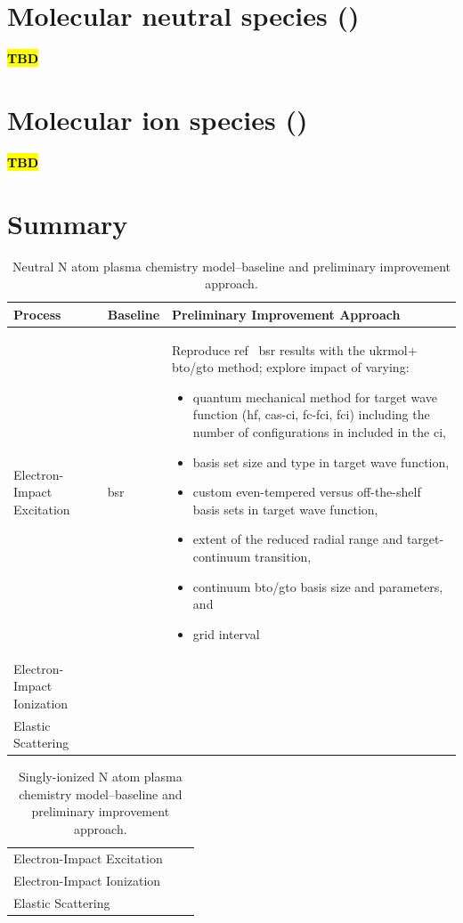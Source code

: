 \documentclass[12pt]{article}
\newcommand{\tbd}{\textcolor{red}{\textbf{\hl{TBD}}}}
\begin{document}
\section{Molecular neutral species ()}
\tbd

\section{Molecular ion species ()}
\tbd

\section{Summary}

\begin{table}
		\caption{Neutral N atom plasma chemistry model--baseline and preliminary improvement approach.}
		\centering
		\begin{tabular}{ p{4cm} p{5cm} p{12cm} }
				\hline\hline
				Process & Baseline & Preliminary Improvement Approach \\ \hline
				Electron-Impact Excitation & \ac{bsr}\cite{wang2014} & 
				Reproduce ref~\cite{wang2014} \ac{bsr} results with the \ac{ukrmol+}
				\ac{bto}/\ac{gto} method;
				explore impact of varying: 
				\begin{itemize}
						\item quantum mechanical method for target wave function (\ac{hf}, 
								\ac{cas}-\ac{ci}, \ac{fc}-\ac{fci}, \ac{fci}) including the number of configurations in included in the \ac{ci},
						\item basis set size and type in target wave function,
						\item custom even-tempered versus off-the-shelf basis sets in target
								wave function, 
						\item extent of the reduced radial range and target-continuum transition,
						\item continuum \ac{bto}/\ac{gto} basis size and parameters, and
						\item \bspline{} grid interval
				\end{itemize} \\
				Electron-Impact Ionization & &  \\
				Elastic Scattering & &  \\
				\hline
		\end{tabular}
\end{table}

\begin{table}
		\caption{Singly-ionized N atom plasma chemistry model--baseline and preliminary improvement approach.}
		\centering
		\begin{tabular}{ p{5cm} p{8cm} p{8cm} }
				\hline\hline
				Electron-Impact Excitation &  & \\
				Electron-Impact Ionization &  & \\
				Elastic Scattering & &  \\
				\hline
		\end{tabular}
\end{table}
\end{document}
